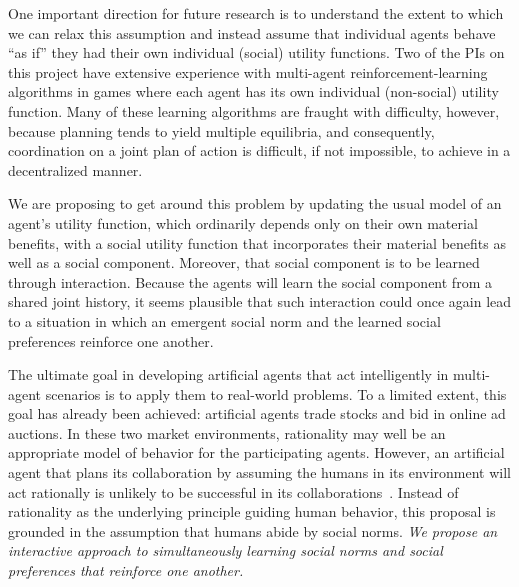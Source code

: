 One important direction for future research is to understand the
extent to which we can relax this assumption and instead assume that
individual agents behave ``as if'' they had their own individual
(social) utility functions.  Two of the PIs on this project have
extensive experience with multi-agent reinforcement-learning
algorithms in games where each agent has its own individual
(non-social) utility function.  Many of these learning algorithms are
fraught with difficulty, however, because planning tends to yield
multiple equilibria, and consequently, coordination on a joint plan of
action is difficult, if not impossible, to achieve in a decentralized
manner.

We are proposing to get around this problem by updating the usual
model of an agent's utility function, which ordinarily depends only on
their own material benefits, with a social utility function that
incorporates their material benefits as well as a social component.
Moreover, that social component is to be learned through interaction.
Because the agents will learn the social component from a shared joint
history, it seems plausible that such interaction could once again
lead to a situation in which an emergent social norm and the learned
social preferences reinforce one another.

The ultimate goal in developing artificial agents that act
intelligently in multi-agent scenarios is to apply them to real-world
problems.  To a limited extent, this goal has already been achieved:
artificial agents trade stocks and bid in online ad auctions.  In
these two market environments, rationality may well be an appropriate
model of behavior for the participating agents.  However,
an artificial agent that plans its collaboration by assuming the
humans in its environment will act rationally is unlikely to be
successful in its collaborations~\cite{Camerer:2003,kahnemanst82}.
Instead of rationality as the underlying principle guiding human
behavior, this proposal is grounded in the assumption that humans
abide by social norms.  \emph{We propose an interactive approach to
  simultaneously learning social norms and social preferences that
  reinforce one another.}

